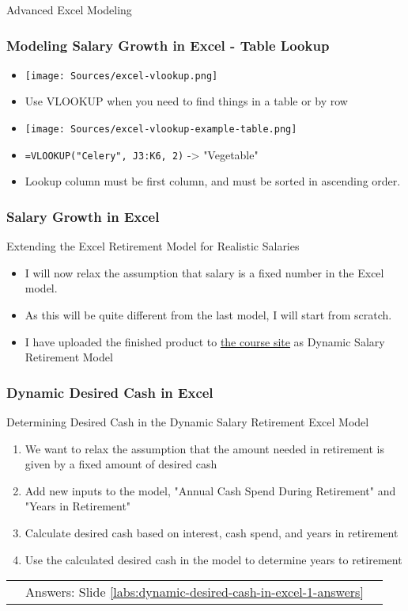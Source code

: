 \documentclass[handout, 11pt]{beamer}
\begin{document}
\begin{section}{Advanced Excel Modeling}
\begin{frame}
\frametitle{Modeling Salary Growth in Excel - Table Lookup}
\begin{itemize}
\item \texttt{[image: Sources/excel-vlookup.png]}
\vfill
\item Use VLOOKUP when you need to find things in a table or by row
\vfill
\item \texttt{[image: Sources/excel-vlookup-example-table.png]}
\vfill
\item \texttt{=VLOOKUP("Celery", J3:K6, 2)}
-> "Vegetable"
\vfill
\item Lookup column must be first column, and must be sorted in ascending order.
\end{itemize}
\end{frame}
\begin{frame}
\frametitle{Salary Growth in Excel}
{
\begin{block}{Extending the Excel Retirement Model for Realistic Salaries}
\begin{itemize}
\item I will now relax the assumption that salary is a fixed number in the Excel model.
\item As this will be quite different from the last model, I will start from scratch.
\item I have uploaded the finished product to
\textcolor{blue}{\underline{\href{https://nickderobertis.github.io/fin-model-course/}{the course site}}}
as Dynamic Salary Retirement Model
\end{itemize}
\end{block}
}
\end{frame}
\begin{frame}
\frametitle{Dynamic Desired Cash in Excel}
{
\begin{block}{Determining Desired Cash in the Dynamic Salary Retirement Excel Model}
\begin{enumerate}
\item We want to relax the assumption that the amount needed in retirement is given by a fixed amount of desired cash
\item Add new inputs to the model, "Annual Cash Spend During Retirement" and "Years in Retirement"
\item Calculate desired cash based on interest, cash spend, and years in retirement
\item Use the calculated desired cash in the model to determine years to retirement
\end{enumerate}
\vfill
\begin{tabular*}{\textwidth}{@{\extracolsep{\fill}}ccc}
\toprule
\hfill & Answers: Slide \textcolor{blue}{\underline{\ref{labs:dynamic-desired-cash-in-excel-1-answers}}} & \hfill\\

\end{tabular*}
\end{block}
}
\label{labs:dynamic-desired-cash-in-excel-1}
\end{frame}
\end{section}
\end{document}
